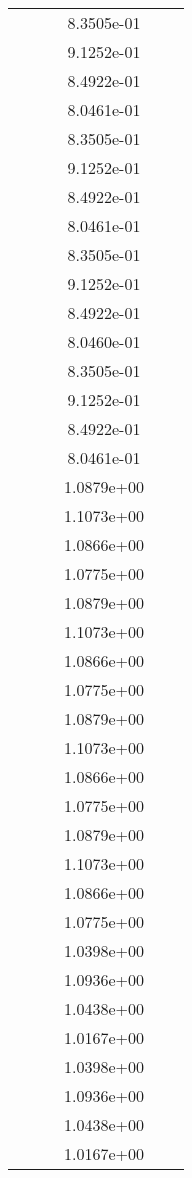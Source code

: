 \begin{xltabular}{\textwidth}{r|rS[table-format=1.3e+2]S[table-format=1.4e+2]S[table-format=1.4e+2]S[table-format=-1.5]}
&  &  & 8.3505e-01 & & \\
&  &  & 9.1252e-01 & & \\
&  &  & 8.4922e-01 & & \\
&  &  & 8.0461e-01 & & \\
&  &  & 8.3505e-01 & & \\
&  &  & 9.1252e-01 & & \\
&  &  & 8.4922e-01 & & \\
&  &  & 8.0461e-01 & & \\
&  &  & 8.3505e-01 & & \\
&  &  & 9.1252e-01 & & \\
&  &  & 8.4922e-01 & & \\
&  &  & 8.0460e-01 & & \\
&  &  & 8.3505e-01 & & \\
&  &  & 9.1252e-01 & & \\
&  &  & 8.4922e-01 & & \\
&  &  & 8.0461e-01 & & \\
&  &  & 1.0879e+00 & & \\
&  &  & 1.1073e+00 & & \\
&  &  & 1.0866e+00 & & \\
&  &  & 1.0775e+00 & & \\
&  &  & 1.0879e+00 & & \\
&  &  & 1.1073e+00 & & \\
&  &  & 1.0866e+00 & & \\
&  &  & 1.0775e+00 & & \\
&  &  & 1.0879e+00 & & \\
&  &  & 1.1073e+00 & & \\
&  &  & 1.0866e+00 & & \\
&  &  & 1.0775e+00 & & \\
&  &  & 1.0879e+00 & & \\
&  &  & 1.1073e+00 & & \\
&  &  & 1.0866e+00 & & \\
&  &  & 1.0775e+00 & & \\
&  &  & 1.0398e+00 & & \\
&  &  & 1.0936e+00 & & \\
&  &  & 1.0438e+00 & & \\
&  &  & 1.0167e+00 & & \\
&  &  & 1.0398e+00 & & \\
&  &  & 1.0936e+00 & & \\
&  &  & 1.0438e+00 & & \\
&  &  & 1.0167e+00 & & \\

\end{xltabular}
